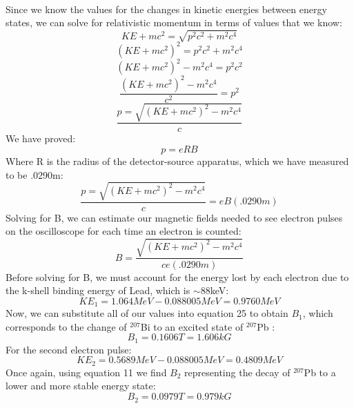 \\
Since we know the values for the changes in kinetic energies between energy states, we can solve for relativistic momentum in terms of values that we know:
\begin{equation}KE+mc^2=\sqrt{p^2c^2+m^2c^4}\end{equation}
\begin{equation}(KE+mc^2)^2=p^2c^2+m^2c^4\end{equation}
\begin{equation}(KE+mc^2)^2-m^2c^4=p^2c^2\end{equation}
\begin{equation}\frac{(KE+mc^2)^2-m^2c^4}{c^2}=p^2\end{equation}
\begin{equation}\frac{p=\sqrt{(KE+mc^2)^2-m^2c^4}}{c}\end{equation}
We have proved:
\begin{equation}p=eRB\end{equation}
Where R is the radius of the detector-source apparatus, which we have measured to be .0290m:
\begin{equation}\frac{p=\sqrt{(KE+mc^2)^2-m^2c^4}}{c}=eB(.0290m)\end{equation}
Solving for B, we can estimate our magnetic fields needed to see electron pulses on the oscilloscope for each time an electron is counted:
\begin{equation}B=\frac{\sqrt{(KE+mc^2)^2-m^2c^4}}{ce(.0290m)}\end{equation}
Before solving for B, we must account for the energy lost by each electron due to the k-shell binding energy of Lead, which is $\sim$88keV:
\begin{equation}KE_1=1.064MeV-0.088005MeV=0.9760 MeV\end{equation}
Now, we can substitute all of our values into equation 25 to obtain $B_1$, which corresponds to the change of $^{207}$Bi to an excited state of $^{207}$Pb :
\begin{equation} B_1=0.1606T=1.606kG\end{equation}
For the second electron pulse:
\begin{equation}KE_2=0.5689MeV-0.088005MeV=0.4809MeV\end{equation}
Once again, using equation 11 we find $B_2$ representing the decay of $^{207}$Pb to a lower and more stable energy state:
\begin{equation}B_2=0.0979T=0.979kG\end{equation}

